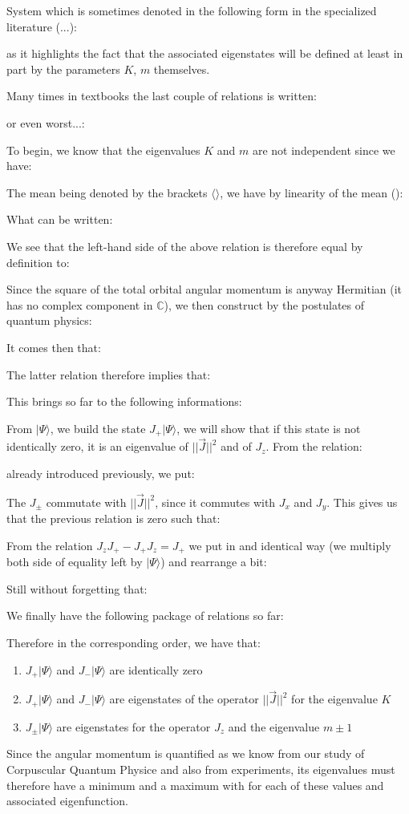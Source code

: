 	System which is sometimes denoted in the following form in the specialized literature (...):
	
	as it highlights the fact that the associated eigenstates will be defined at least in part by the parameters $K$, $m$ themselves.
	
	Many times in textbooks the last couple of relations is written:
	
	or even worst...:
	
	To begin, we know that the eigenvalues $K$ and $m$ are not independent since we have:
	
	The mean being denoted by the brackets $\langle \rangle$, we have by linearity of the mean ():
	
	What can be written:
	
	We see that the left-hand side of the above relation is therefore equal by definition to:
	
	Since the square of the total orbital angular momentum is anyway Hermitian (it has no complex component in $\mathbb{C}$), we then construct by the postulates of quantum physics:
	
	It comes then that:
	
	The latter relation therefore implies that:
	
	This brings so far to the following informations:
	
	From $|\Psi\rangle$, we build the state $J_+|\Psi\rangle$, we will show that if this state is not identically zero, it is an eigenvalue of $||\vec{J}||^2$ and of $J_z$. From the relation:
	
	already introduced previously, we put:
	
	The $J_{\pm}$ commutate with $||\vec{J}||^2$, since it commutes with $J_x$ and $J_y$. This gives us that the previous relation is zero such that:
	
	From the relation $J_zJ_+-J_+J_z=J_+$ we put in and identical way (we multiply both side of equality left by $|\Psi\rangle$) and rearrange a bit:
	
	Still without forgetting that:
	
	We finally have the following package of relations so far:
	
	Therefore in the corresponding order, we have that:
	\begin{enumerate}
		\item $J_+|\Psi\rangle$ and $J_-|\Psi\rangle$ are identically zero
		\item $J_+|\Psi\rangle$ and $J_-|\Psi\rangle$ are eigenstates of the operator $||\vec{J}||^2$ for the eigenvalue $K$
		
		\item $J_\pm|\Psi\rangle$ are eigenstates for the operator $J_z$ and the eigenvalue $m\pm 1$
	\end{enumerate} 
	Since the angular momentum is quantified as we know from our study of Corpuscular Quantum Physice and also from experiments, its eigenvalues must therefore have a minimum and a maximum with for each of these values and associated eigenfunction.
	

